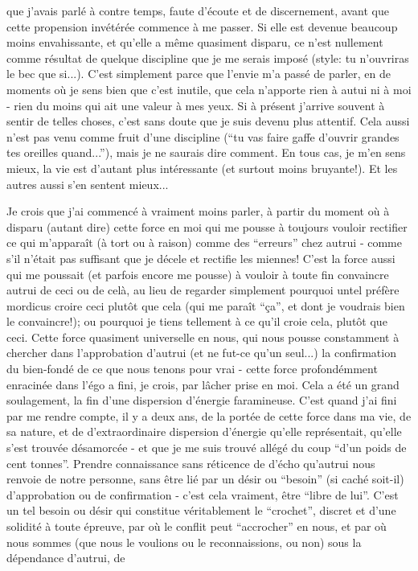 que j'avais parlé à contre temps, faute d'écoute et de discernement, avant que cette propension invétérée commence à me passer. Si elle est devenue beaucoup moins envahissante, et qu'elle a même quasiment disparu, ce n'est nullement comme résultat de quelque discipline que je me serais imposé (style: tu n'ouvriras le bec que si...). C'est simplement parce que l'envie m'a passé de parler, en de moments où je sens bien que c'est inutile, que cela n'apporte rien à autui ni à moi - rien du moins qui ait une valeur à mes yeux. Si à présent j'arrive souvent à sentir de telles choses, c'est sans doute que je suis devenu plus attentif. Cela aussi n'est pas venu comme fruit d'une discipline (``tu vas faire gaffe d'ouvrir grandes tes oreilles quand...''), mais je ne saurais dire comment. En tous cas, je m'en sens mieux, la vie est d'autant plus intéressante (et surtout moins bruyante!). Et les autres aussi s'en sentent mieux...

Je crois que j'ai commencé à vraiment moins parler, à partir du moment où à disparu (autant dire) cette force en moi qui me pousse à toujours vouloir rectifier ce qui m'apparaît (à tort ou à raison) comme des ``erreurs'' chez autrui - comme s'il n'était pas suffisant que je décele et rectifie les miennes! C'est la force aussi qui me poussait (et parfois encore me pousse) à vouloir à toute fin convaincre autrui de ceci ou de celà, au lieu de regarder simplement pourquoi untel préfère mordicus croire ceci plutôt que cela (qui me paraît ``ça'', et dont je voudrais bien le convaincre!); ou pourquoi je tiens tellement à ce qu'il croie cela, plutôt que ceci. Cette force quasiment universelle en nous, qui nous pousse constamment à chercher dans l'approbation d'autrui (et ne fut-ce qu'un seul...) la confirmation du bien-fondé de ce que nous tenons pour vrai - cette force profondémment enracinée dans l'égo a fini, je crois, par lâcher prise en moi. Cela a été un grand soulagement, la fin d'une dispersion d'énergie faramineuse. C'est quand j'ai fini par me rendre compte, il y a deux ans, de la portée de cette force dans ma vie, de sa nature, et de d'extraordinaire dispersion d'énergie qu'elle représentait, qu'elle s'est trouvée désamorcée - et que je me suis trouvé allégé du coup ``d'un poids de cent tonnes''. Prendre connaissance sans réticence de d'écho qu'autrui nous renvoie de notre personne, sans être lié par un désir ou ``besoin'' (si caché soit-il) d'approbation ou de confirmation - c'est cela vraiment, être ``libre de lui''. C'est un tel besoin ou désir qui constitue véritablement le ``crochet'', discret et d'une solidité à toute épreuve, par où le conflit peut ``accrocher'' en nous, et par où nous sommes (que nous le voulions ou le reconnaissions, ou non) sous la dépendance d'autrui, de
